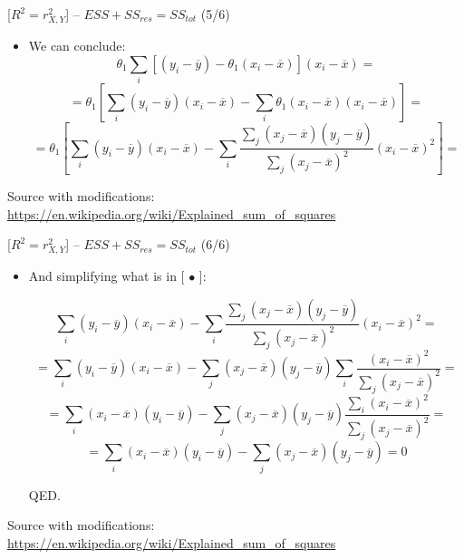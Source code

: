 \documentclass{beamer}
\begin{document}
\begin{frame}
{\centerline{ [$R^2 = r_{X,Y}^2$] -- $ESS + SS_{res} = SS_{tot} $ (5/6)}}

\begin{itemize}
\item We can conclude:
$$ \theta_1 \sum_i[(y_{i}-{\overline {y}})-{\theta_1}(x_{i}-{\overline {x}}) ](x_i - \overline{x}) = $$
$$ = \theta_1 [\sum_i (y_{i}-{\overline {y}}) (x_i - \overline{x}) -
\sum_i{\theta_1}(x_{i}-{\overline {x}}) (x_i - \overline{x})] = $$
$$ = \theta_1 [\sum_i (y_{i}-{\overline {y}}) (x_i - \overline{x}) -
\sum_i{{\frac {\sum _{j}(x_{j}-{\overline {x}})(y_{j}-{\overline {y}})}{\sum _{j}(x_{j}-{\overline {x}})^{2}}}
}(x_{i}-{\overline {x}})^2] = $$


\end{itemize}

\begin{center}
\tiny 
Source with modifications: \url{https://en.wikipedia.org/wiki/Explained_sum_of_squares}
\end{center}

\end{frame}

\begin{frame}
{\centerline{ [$R^2 = r_{X,Y}^2$] -- $ESS + SS_{res} = SS_{tot} $ (6/6)}}

\begin{itemize}
\item And simplifying what is in [ $\bullet$ ]:

$$ \sum_i (y_{i}-{\overline {y}}) (x_i - \overline{x}) -
\sum_i{{\frac {\sum _{j}(x_{j}-{\overline {x}})(y_{j}-{\overline {y}})}{\sum _{j}(x_{j}-{\overline {x}})^{2}}}
}(x_{i}-{\overline {x}})^2 = $$
$$=  \sum_i (y_{i}-{\overline {y}}) (x_i - \overline{x}) -
\sum _{j}(x_{j}-{\overline {x}})(y_{j}-{\overline {y}})\sum_i{{\frac {(x_{i}-{\overline {x}})^2}{\sum _{j}(x_{j}-{\overline {x}})^{2}}}
}= $$
$$=  \sum_i (x_i - \overline{x}) (y_{i}-{\overline {y}})  -
\sum _{j}(x_{j}-{\overline {x}})(y_{j}-{\overline {y}}){\frac {\sum_i{(x_{i}-{\overline {x}})^2}}{\sum _{j}(x_{j}-{\overline {x}})^{2}}} = $$
$$=  \sum_i (x_i - \overline{x}) (y_{i}-{\overline {y}})  -
\sum _{j}(x_{j}-{\overline {x}})(y_{j}-{\overline {y}}) = 0 $$


QED.


\end{itemize}

\begin{center}
\tiny 
Source with modifications: \url{https://en.wikipedia.org/wiki/Explained_sum_of_squares}
\end{center}

\end{frame}
\end{document}
